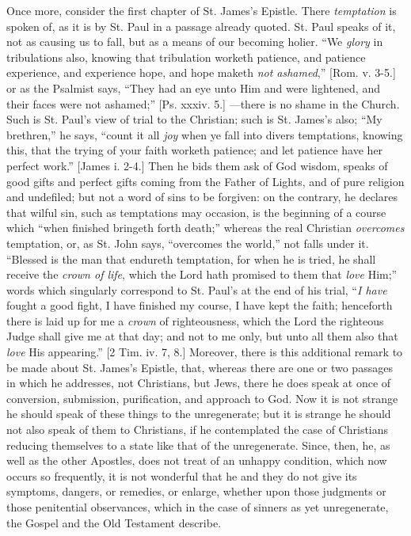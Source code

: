 Once more, consider the first chapter of St. James's Epistle. There
\emph{temptation} is spoken of, as it is by St. Paul in a passage
already quoted. St. Paul speaks of it, not as causing us to fall, but
as a means of our becoming holier. ``We \emph{glory} in
tribulations also, knowing that tribulation worketh patience, and
patience experience, and experience hope, and hope maketh \emph{not
ashamed},'' [Rom. v. 3-5.] or as the Psalmist says, ``They
had an eye unto Him and were lightened, and their faces were not
ashamed;'' [Ps. xxxiv. 5.] —there is no shame in the Church. Such
is St. Paul's view of trial to the Christian; such is St. James's
also; ``My brethren,'' he says, ``count it all \emph{joy}
when ye fall into divers temptations, knowing this, that the trying of
your faith worketh patience; and let patience have her perfect
work.'' [James i. 2-4.] Then he bids them ask of God wisdom,
speaks of good gifts and perfect gifts coming from the Father of
Lights, and of pure religion and undefiled; but not a word of sins to
be forgiven: on the contrary, he declares that wilful sin, such as
temptations may occasion, is the beginning of a course which
``when finished bringeth forth death;'' whereas the real
Christian \emph{overcomes} temptation, or, as St. John says,
``overcomes the world,'' not falls under it. ``Blessed is
the man that endureth temptation, for when he is tried, he shall
receive the \emph{crown of life}, which the Lord hath promised to them
that \emph{love} Him;'' words which singularly correspond to St.
Paul's at the end of his trial, ``\emph{I have} fought a good
fight, I have finished my course, I have kept the faith; henceforth
there is laid up for me a \emph{crown} of righteousness, which the
Lord the righteous Judge shall give me at that day; and not to me
only, but unto all them also that \emph{love} His appearing.'' [2 Tim.
iv. 7, 8.] Moreover, there is this additional remark to be made about
St. James's Epistle, that, whereas there are one or two passages in
which he addresses, not Christians, but Jews, there he does speak at
once of conversion, submission, purification, and approach to God. Now
it is not strange he should speak of these things to the unregenerate;
but it is strange he should not also speak of them to Christians, if
he contemplated the case of Christians reducing themselves to a state
like that of the unregenerate. Since, then, he, as well as the other
Apostles, does not treat of an unhappy condition, which now occurs so
frequently, it is not wonderful that he and they do not give its
symptoms, dangers, or remedies, or enlarge, whether upon those
judgments or those penitential observances, which in the case of
sinners as yet unregenerate, the Gospel and the Old Testament
describe.

